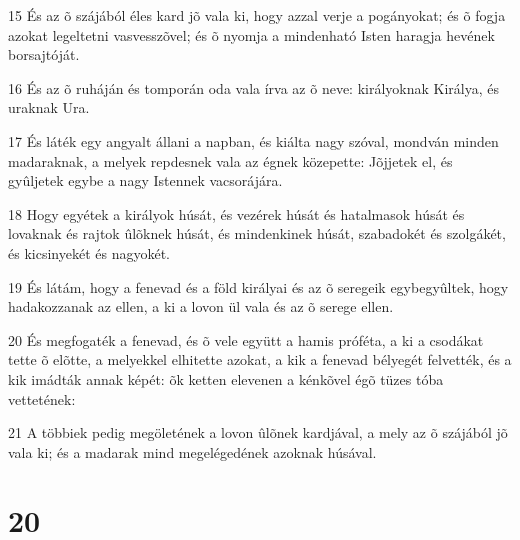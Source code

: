 \par 15 És az õ szájából éles kard jõ vala ki, hogy azzal verje a pogányokat; és õ fogja azokat  legeltetni vasvesszõvel; és õ nyomja a mindenható Isten haragja hevének borsajtóját.
\par 16 És az õ ruháján és tomporán oda vala írva az õ neve: királyoknak Királya, és uraknak Ura.
\par 17 És láték egy angyalt állani a napban, és kiálta nagy szóval, mondván minden madaraknak, a melyek repdesnek vala az égnek közepette: Jõjjetek el, és gyûljetek egybe a nagy Istennek vacsorájára.
\par 18 Hogy egyétek a királyok húsát, és vezérek húsát és hatalmasok húsát és lovaknak és rajtok ûlõknek húsát, és mindenkinek húsát, szabadokét és szolgákét, és kicsinyekét és nagyokét.
\par 19 És látám, hogy a fenevad és a föld királyai és az õ seregeik egybegyûltek, hogy hadakozzanak az ellen, a ki a lovon ül vala és az õ serege ellen.
\par 20 És megfogaték a fenevad, és õ vele együtt a hamis próféta,  a ki a csodákat tette õ elõtte, a melyekkel elhitette azokat, a kik a fenevad bélyegét felvették, és a kik imádták annak képét: õk ketten elevenen a kénkõvel égõ tüzes tóba vettetének:
\par 21 A többiek pedig megöletének a lovon ûlõnek kardjával, a mely az õ szájából jõ vala ki; és a madarak mind  megelégedének azoknak húsával.

\chapter{20}


